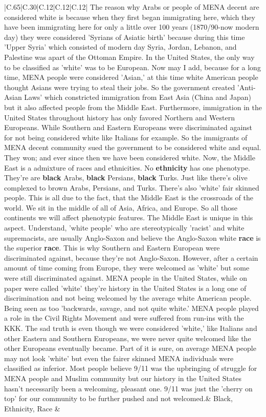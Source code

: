 \documentclass[11pt]{article}
\newlength\mylength
\begin{document}
\begin{center}
\begin{longtable}{|C{.65\mylength}|C{.30\mylength}|C{.12\mylength}|C{.12\mylength}|C{.12\mylength}|}
  \small The reason why Arabs or people of MENA decent are considered white is because when they first began immigrating here, which they have been immigrating here for only a little over 100 years (1870/90-now modern day) they were considered 'Syrians of Asiatic birth' because during this time 'Upper Syria' which consisted of modern day Syria, Jordan, Lebanon, and Palestine was apart of the Ottoman Empire. In the United States, the only way to be classified as 'white' was to be European. Now may I add, because for a long time, MENA people were considered 'Asian,' at this time white American people thought Asians were trying to steal their jobs. So the government created 'Anti-Asian Laws' which constricted immigration from East Asia (China and Japan) but it also affected people from the Middle East. Furthermore, immigration in the United States throughout history has only favored Northern and Western Europeans. While Southern and Eastern Europeans were discriminated against for not being considered white like Italians for example. So the immigrants of MENA decent community sued the government to be considered white and equal. They won; and ever since then we have been considered white. Now, the Middle East is a admixture of races and ethnicities. No \textbf{ethnicity} has one phenotype. They're are \textbf{black} Arabs, \textbf{black} Persians, \textbf{black} Turks. Just like there's olive complexed to brown Arabs, Persians, and Turks. There's also 'white' fair skinned people. This is all due to the fact, that the Middle East is the crossroads of the world. We sit in the middle of all of Asia, Africa, and Europe. So all those continents we will affect phenotypic features. The Middle East is unique in this aspect. Understand, 'white people' who are stereotypically 'racist' and white supremacists, are usually Anglo-Saxon and believe the Anglo-Saxon white \textbf{race} is the superior \textbf{race}. This is why Southern and Eastern European were discriminated against, because they're not Anglo-Saxon. However, after a certain amount of time coming from Europe, they were welcomed as 'white' but some were still discriminated against. MENA people in the United States, while on paper were called 'white' they're history in the United States is a long one of discrimination and not being welcomed by the average white American people. Being seen as too 'backwards, savage, and not quite white.' MENA people played a role in the Civil Rights Movement and were suffered from run-ins with the KKK. The sad truth is even though we were considered 'white,' like Italians and other Eastern and Southern Europeans, we were never quite welcomed like the other Europeans eventually became. Part of it is sure, on average MENA people may not look 'white' but even the fairer skinned MENA individuals were classified as inferior. Most people believe 9/11 was the upbringing of struggle for MENA people and Muslim community but our history in the United States hasn't necessarily been a welcoming, pleasant one. 9/11 was just the 'cherry on top' for our community to be further pushed and not welcomed.\normalsize   & Black, Ethnicity, Race & 
\end{longtable}
\end{center}
\end{document}
